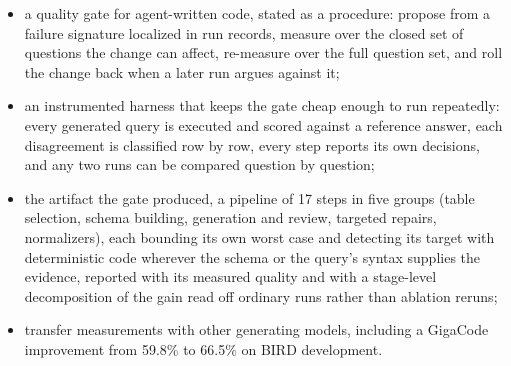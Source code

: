 \begin{itemize}
\item a quality gate for agent-written code, stated as a procedure: propose
  from a failure signature localized in run records, measure over the closed
  set of questions the change can affect, re-measure over the full question
  set, and roll the change back when a later run argues against it;
\item an instrumented harness that keeps the gate cheap enough to run
  repeatedly: every generated query is executed and scored against a reference
  answer,
  each disagreement is classified row by row, every step reports its own
  decisions, and any two runs can be compared question by question;
\item the artifact the gate produced, a pipeline of 17 steps in five groups
  (table selection, schema building, generation and review, targeted repairs,
  normalizers), each bounding its own worst case and detecting its target with
  deterministic code wherever the schema or the query's syntax supplies the
  evidence, reported with its measured quality and with a stage-level
  decomposition of the gain read off ordinary runs rather than ablation
  reruns;
\item transfer measurements with other generating models, including a
  GigaCode improvement from 59.8\% to 66.5\% on BIRD development.
\end{itemize}
